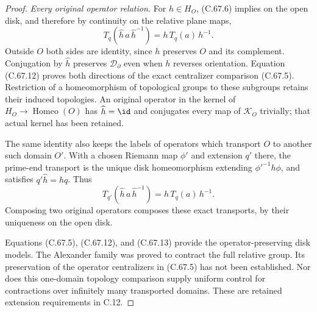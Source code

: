 \begin{proof}
\emph{Every original operator relation.}
For $h\in H_O$, (C.67.6)
implies on the open disk,
and therefore by continuity
on the relative plane maps,
\[
 T_q(\widehat h\,a\,\widehat h^{-1})
       =h\,T_q(a)\,h^{-1}.
                                                               \tag{C.67.12}
\]
Outside $O$ both sides are
identity, since $h$ preserves
$O$ and its complement.
Conjugation by $\widehat h$
preserves $\mathcal D_\partial$
even when $h$ reverses orientation.
Equation (C.67.12) proves both
directions of the exact
centralizer comparison (C.67.5).
Restriction of a homeomorphism
of topological groups to these
subgroups retains their
induced topologies.
An original operator in the
kernel of $H_O\to\operatorname{Homeo}(O)$
has $\widehat h=\id$ and
conjugates every map of
$\mathcal K_O$ trivially;
that actual kernel has been
retained.

The same identity also keeps
the labels of operators which
transport $O$ to another such
domain $O'$. With a chosen
Riemann map $\phi'$ and extension
$q'$ there, the prime-end
transport is the unique disk
homeomorphism extending
$\phi'^{-1}h\phi$, and satisfies
$q'\widehat h=hq$.
Thus
\[
 T_{q'}(\widehat h\,a\,\widehat h^{-1})
        =h\,T_q(a)\,h^{-1}.                             \tag{C.67.13}
\]
Composing two original operators
composes these exact transports,
by their uniqueness on the
open disk.

Equations (C.67.5), (C.67.12),
and (C.67.13) provide the
operator-preserving disk models.
The Alexander family was proved
to contract the full relative
group. Its preservation of the
operator centralizers in
(C.67.5) has not been established.
Nor does this one-domain
topology comparison supply
uniform control for contractions
over infinitely many transported
domains. These are retained
extension requirements in C.12.
\end{proof}
